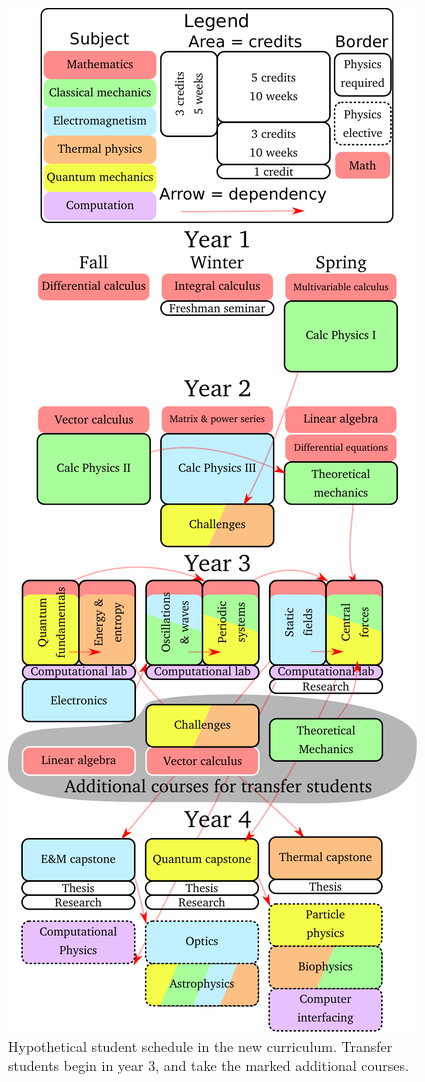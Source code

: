 \documentclass[english,aps,pra,reprint,noshowpacs,superscriptaddress]{revtex4-1}
\begin{document}
\begin{figure}
\includegraphics[width=\columnwidth]{vertical-schedule}
\caption{Hypothetical student schedule in the new curriculum.
  Transfer students begin in year 3, and take the marked additional
  courses.\label{fig:schedule}}
\end{figure}
\end{document}
